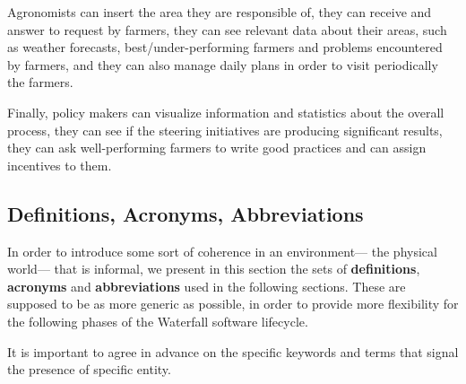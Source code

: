 Agronomists can insert the area they are responsible of, they can receive and answer to request by farmers, they can see relevant data about their areas, such as weather forecasts, best/under-performing farmers and problems encountered by farmers, and they can also manage daily plans in order to visit periodically the farmers.

Finally, policy makers can visualize information and statistics about the overall process, they can see if the steering initiatives are producing significant results, they can ask well-performing farmers to write good practices and can assign incentives to them.



\subsection{Definitions, Acronyms, Abbreviations}
\label{sec:def_acr_abr}
In order to introduce some sort of coherence in an environment--- the physical world--- that is informal, we present in this section the sets of \textbf{definitions}, \textbf{acronyms} and \textbf{abbreviations} used in the following sections. These are supposed to be as more generic as possible, in order to provide more flexibility for the following phases of the Waterfall software lifecycle.

It is important to agree in advance on the specific keywords and terms that signal the presence of specific entity.

